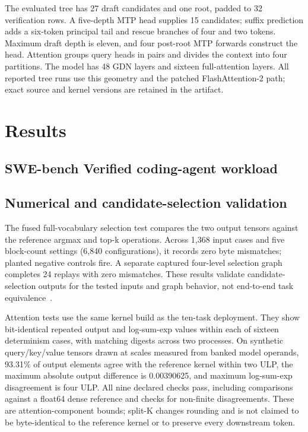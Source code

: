 \documentclass[conference]{IEEEtran}
\begin{document}
The evaluated tree has 27 draft candidates and one root, padded to 32 verification rows. A five-depth MTP head supplies 15 candidates; suffix prediction adds a six-token principal tail and rescue branches of four and two tokens. Maximum draft depth is eleven, and four post-root MTP forwards construct the head. Attention groups query heads in pairs and divides the context into four partitions. The model has 48 GDN layers and sixteen full-attention layers. All reported tree runs use this geometry and the patched FlashAttention-2 path; exact source and kernel versions are retained in the artifact.

\section{Results}
\label{sec:results}
\subsection{SWE-bench Verified coding-agent workload}
\label{sec:agent-workload}


\subsection{Numerical and candidate-selection validation}
\label{sec:current-validation}
The fused full-vocabulary selection test compares the two output tensors against the reference argmax and top-k operations. Across 1,368 input cases and five block-count settings (6,840 configurations), it records zero byte mismatches; planted negative controls fire. A separate captured four-level selection graph completes 24 replays with zero mismatches. These results validate candidate-selection outputs for the tested inputs and graph behavior, not end-to-end task equivalence~\cite{lumo2026archive}.

Attention tests use the same kernel build as the ten-task deployment. They show bit-identical repeated output and log-sum-exp values within each of sixteen determinism cases, with matching digests across two processes. On synthetic query/key/value tensors drawn at scales measured from banked model operands, 93.31\% of output elements agree with the reference kernel within two ULP, the maximum absolute output difference is 0.00390625, and maximum log-sum-exp disagreement is four ULP. All nine declared checks pass, including comparisons against a float64 dense reference and checks for non-finite disagreements. These are attention-component bounds; split-K changes rounding and is not claimed to be byte-identical to the reference kernel or to preserve every downstream token.
\end{document}
